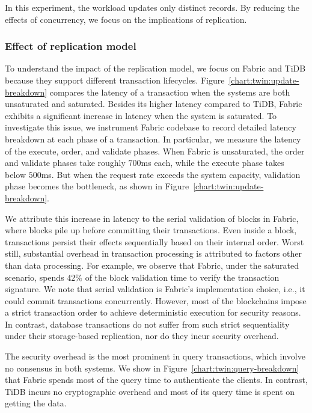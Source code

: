 In this experiment, the workload updates only distinct records. 
By reducing the effects of concurrency, we focus on the implications of replication. 

\subsubsection{Effect of replication model}
\label{sec:twin:exp:replication:model}
To understand the impact of the replication model, we focus on Fabric and TiDB
because they support different transaction lifecycles.
Figure~\ref{chart:twin:update-breakdown} compares the latency of a transaction when the
systems are both unsaturated and saturated. Besides its higher latency compared
to TiDB, Fabric exhibits a significant increase in latency when the system is
saturated. To investigate this issue, we instrument Fabric codebase to record
detailed latency breakdown at each phase of a transaction. In particular, we
measure the latency of the execute, order, and validate phases.
When Fabric is unsaturated, the order and validate phases take roughly $700$ms
each, while the execute phase takes below $500$ms.
But when the request rate exceeds the system capacity, validation phase
becomes the bottleneck, as shown in Figure~\ref{chart:twin:update-breakdown}.

We attribute this increase in latency to the serial validation of
blocks in Fabric, where blocks pile up before committing their transactions.
Even inside a block, transactions persist their effects sequentially
based on their internal order.
Worst still, substantial overhead in transaction processing is attributed to
factors other than data processing.
For example, we observe that Fabric, under the saturated scenario, spends $42\%$
of the block validation time to verify the transaction signature.
We note that serial validation is Fabric's implementation choice, i.e., it could
commit transactions concurrently.
However, most of the blockchains impose a strict transaction order to achieve
deterministic execution for security reasons.
In contrast, database transactions do not suffer from such strict sequentiality
under their storage-based replication, nor do they incur security overhead.

The security overhead is the most prominent in query transactions,
which involve no consensus in both systems.
We show in Figure~\ref{chart:twin:query-breakdown} that Fabric spends most of the query
time to authenticate the clients.
In contrast, TiDB incurs no cryptographic overhead and most of its query time is
spent on getting the data.


